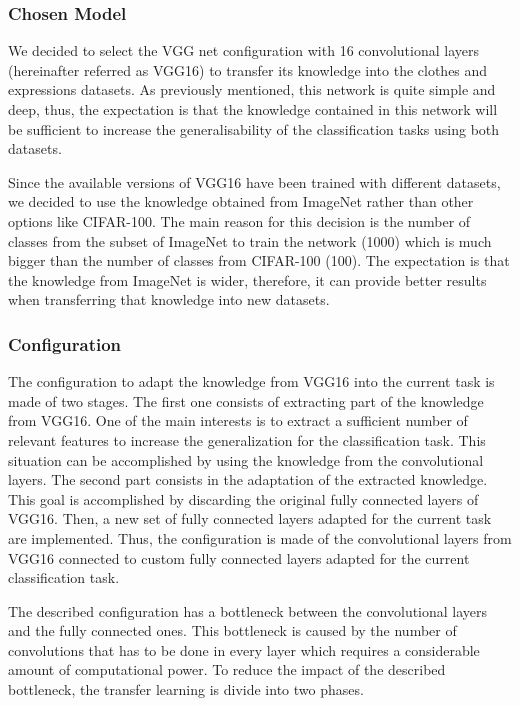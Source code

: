 \documentclass{article}
\begin{document}
\subsubsection{\textbf{Chosen Model}}

We decided to select the VGG net configuration with 16 convolutional layers (hereinafter referred as VGG16) to transfer its knowledge into the clothes and expressions datasets. As previously mentioned, this network is quite simple and deep, thus, the expectation is that the knowledge contained in this network will be sufficient to increase the generalisability of the classification tasks using both datasets.

Since the available versions of VGG16 have been trained with different datasets, we decided to use the knowledge obtained from ImageNet rather than other options like CIFAR-100. The main reason for this decision is the number of classes from the subset of ImageNet to train the network (1000) which is much bigger than the number of classes from CIFAR-100 (100). The expectation is that the knowledge from ImageNet is wider, therefore, it can provide better results when transferring that knowledge into new datasets.


\subsubsection{\textbf{Configuration}}
The configuration to adapt the knowledge from VGG16 into the current task is made of two stages. The first one consists of extracting part of the knowledge from VGG16. One of the main interests is to extract a sufficient number of relevant features to increase the generalization for the classification task. This situation can be accomplished by using the knowledge from the convolutional layers. The second part consists in the adaptation of the extracted knowledge. This goal is accomplished by discarding the original fully connected layers of VGG16. Then, a new set of fully connected layers adapted for the current task are implemented. Thus, the configuration is made of the convolutional layers from VGG16 connected to custom fully connected layers adapted for the current classification task.

The described configuration has a bottleneck between the convolutional layers and the fully connected ones. This bottleneck is caused by the number of convolutions that has to be done in every layer which requires a considerable amount of computational power. To reduce the impact of the described bottleneck, the transfer learning is divide into two phases.
\end{document}
